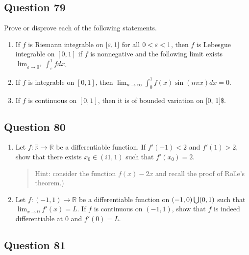 \documentclass[12pt]{article}
\begin{document}
\hypertarget{question-79-1}{%
\subsection{Question 79}\label{question-79-1}}

Prove or disprove each of the following statements.

\begin{enumerate}
\def\labelenumi{(\alph{enumi})}
\setcounter{enumi}{5}
\item
  If \(f\) is Riemann integrable on \([\varepsilon, 1]\) for all
  \(0 < \varepsilon < 1\), then \(f\) is Lebesgue integrable on \([0,1]\) if
  \(f\) is nonnegative and the following limit exists
  \(\lim_{\varepsilon\to 0^+} \int_\varepsilon^1 f dx\).
\item
  If \(f\) is integrable on \([0,1]\), then
  \(\lim_{n\to\infty} \int_0^1 f(x)\sin(n\pi x)dx = 0\).
\item
  If \(f\) is continuous on \([0, 1]\), then it is of bounded variation
  on {[}0, 1{]}\$.
\end{enumerate}

\hypertarget{question-80-1}{%
\subsection{Question 80}\label{question-80-1}}

\begin{enumerate}
\def\labelenumi{(\alph{enumi})}
\item
  Let \(f : \mathbb{R} \to \mathbb{R}\) be a differentiable function. If
  \(f'(-1) < 2\) and \(f'(1) > 2\), show that there exists
  \(x_0 \in (i1, 1)\) such that \(f'(x_0) = 2\).

  \begin{quote}
  Hint: consider the function \(f(x) - 2x\) and recall the proof of
  Rolle's theorem.)
  \end{quote}
\item
  Let \(f : (-1, 1) \to \mathbb{R}\) be a differentiable function on
  \((-1, 0) \bigcup (0, 1)\) such that \(\lim_{x\to 0} f'(x) = L\). If
  \(f\) is continuous on \((-1, 1)\), show that \(f\) is indeed
  differentiable at \(0\) and \(f'(0) = L\).
\end{enumerate}

\hypertarget{question-81-1}{%
\subsection{Question 81}\label{question-81-1}}
\end{document}
